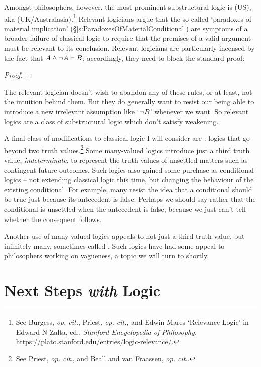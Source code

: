 Amongst philosophers, however, the most prominent substructural logic is  (US), aka  (UK/Australasia).\footnote{See Burgess, \emph{op. cit.}, Priest, \emph{op. cit.}, and Edwin Mares `Relevance Logic' in Edward N Zalta, ed., \emph{Stanford Encyclopedia of Philosophy}, \url{https://plato.stanford.edu/entries/logic-relevance/}.} Relevant logicians argue that the so-called `paradoxes of material implication' (§\ref{s:ParadoxesOfMaterialConditional}) are symptoms of a broader failure of classical logic to require that the premises of a valid argument must be relevant to its conclusion. Relevant logicians are particularly incensed by the fact that $A \wedge \neg A \vdash B$; accordingly, they need to block the standard proof: \begin{proof}
	\open
	\close
\end{proof} The relevant logician doesn't wish to abandon any of these rules, or at least, not the intuition behind them. But they do generally want to resist our being able to introduce a new irrelevant assumption like `$\neg B$' whenever we want. So relevant logics are a class of substructural logic which don't satisfy weakening.


A final class of modifications to classical logic I will consider are : logics that go beyond two truth values.\footnote{See Priest, \emph{op. cit.}, and Beall and van Fraassen, \emph{op. cit.}.} Some many-valued logics introduce just a third truth value, \emph{indeterminate}, to represent the truth values of unsettled matters such as contingent future outcomes. Such logics also gained some purchase as conditional logics – not extending classical logic this time, but changing the behaviour of the existing conditional. For example, many resist the idea that a conditional should be true just because its antecedent is false. Perhaps we should say rather that the conditional is unsettled when the antecedent is false, because we just can't tell whether the consequent follows. 

Another use of many valued logics appeals to not just a third truth value, but infinitely many, sometimes called . Such logics have had some appeal to philosophers working on vagueness, a topic we will turn to shortly.

\section{Next Steps \emph{with} Logic}\label{stepwith}

